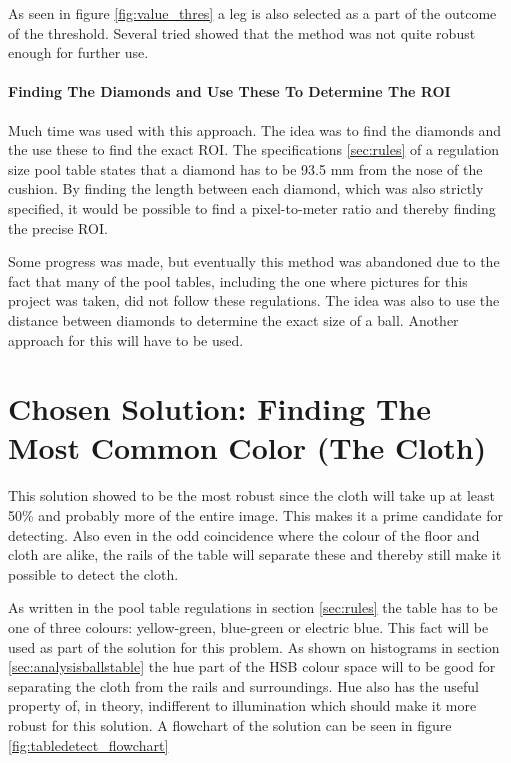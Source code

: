 As seen in figure \ref{fig:value_thres} a leg is also selected as a part of the outcome of the threshold. Several tried showed that the method was not quite robust enough for further use.

\paragraph{Finding The Diamonds and Use These To Determine The ROI}
Much time was used with this approach. The idea was to find the diamonds and the use these to find the exact ROI. The specifications \ref{sec:rules} of a regulation size pool table states that a diamond has to be 93.5 mm from the nose of the cushion. By finding the length between each diamond, which was also strictly specified, it would be possible to find a pixel-to-meter ratio and thereby finding the precise ROI.

Some progress was made, but eventually this method was abandoned due to the fact that many of the pool tables, including the one where pictures for this  project was taken, did not follow these regulations. The idea was also to use the distance between diamonds to determine the exact size of a ball. Another approach for this will have to be used.

\section{Chosen Solution: Finding The Most Common Color (The Cloth)}
This solution showed to be the most robust since the cloth will take up at least 50\% and probably more of the entire image. This makes it a prime candidate for detecting. Also even in the odd coincidence where the colour of the floor and cloth are alike, the rails of the table will separate these and thereby still make it possible to detect the cloth.

As written in the pool table regulations in section \ref{sec:rules} the table has to be one of three colours: yellow-green, blue-green or electric blue. This fact will be used as part of the solution for this problem. As shown on histograms in section \ref{sec:analysisballstable} the hue part of the HSB colour space will to be good for separating the cloth from the rails and surroundings. Hue also has the useful property of, in theory, indifferent to illumination which should make it more robust for this solution. A flowchart of the solution can be seen in figure \ref{fig:tabledetect_flowchart}


